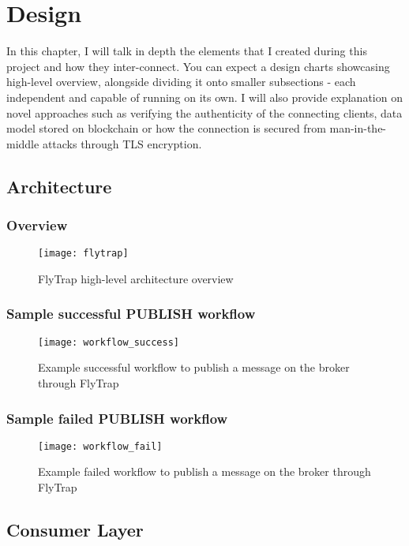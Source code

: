\chapter{Design\label{chap:design}}
In this chapter, I will talk in depth the elements that I created during this project and how they inter-connect. You can expect a design charts showcasing high-level overview, alongside dividing it onto smaller subsections - each independent and capable of running on its own. I will also provide explanation on novel approaches such as verifying the authenticity of the connecting clients, data model stored on blockchain or how the connection is secured from man-in-the-middle attacks through TLS encryption.

\section{Architecture}

\subsection{Overview}
\begin{figure}[h]
    \centering
    \texttt{[image: flytrap]}
    \caption{FlyTrap high-level architecture overview}
    \label{fig:flytrap}
\end{figure}


\subsection{Sample successful PUBLISH workflow}
\begin{figure}[h]
    \centering
    \texttt{[image: workflow\_success]}
    \caption{Example successful workflow to publish a message on the broker through FlyTrap}
    \label{fig:workflow_success}
\end{figure}
\subsection{Sample failed PUBLISH workflow}
\begin{figure}[h]
    \centering
    \texttt{[image: workflow\_fail]}
    \caption{Example failed workflow to publish a message on the broker through FlyTrap}
    \label{fig:workflow_fail}
\end{figure}

\section{Consumer Layer}

